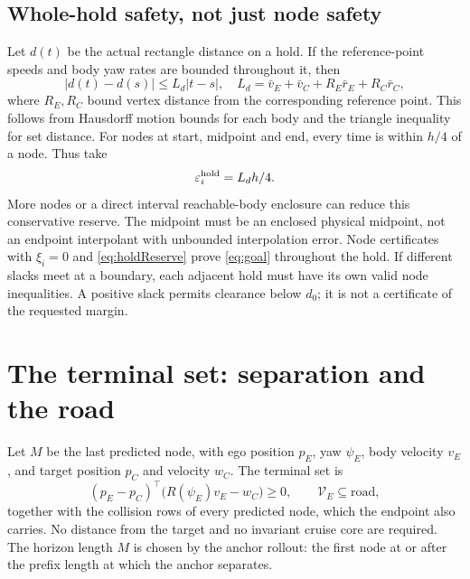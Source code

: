 \documentclass[10pt,letterpaper]{article}
\begin{document}
\subsection{Whole-hold safety, not just node safety}
Let $d(t)$ be the actual rectangle distance on a hold. If the reference-point
speeds and body yaw rates are bounded throughout it, then
\begin{equation}\label{eq:holdLipschitz}
|d(t)-d(s)|\le L_d|t-s|,\quad
L_d=\bar v_E+\bar v_C+R_E\bar r_E+R_C\bar r_C,
\end{equation}
where $R_E,R_C$ bound vertex distance from the corresponding reference point.
This follows from Hausdorff motion bounds for each body and the triangle
inequality for set distance. For nodes at start, midpoint and end, every time
is within $h/4$ of a node. Thus take
\begin{equation}\label{eq:holdReserve}
\varepsilon_i^{\rm hold}=L_dh/4.
\end{equation}
More nodes or a direct interval reachable-body enclosure can reduce this
conservative reserve. The midpoint must be an enclosed physical midpoint, not
an endpoint interpolant with unbounded interpolation error. Node certificates
with $\xi_i=0$ and \eqref{eq:holdReserve} prove \eqref{eq:goal} throughout the
hold. If different slacks meet at a boundary, each adjacent hold must have its
own valid node inequalities. A positive slack permits clearance below $d_0$;
it is not a certificate of the requested margin.

\section{The terminal set: separation and the road}
Let $M$ be the last predicted node, with ego position $p_E$, yaw $\psi_E$,
body velocity $v_E$, and target position $p_C$ and velocity $w_C$. The terminal
set is
\begin{equation}\label{eq:terminal}
(p_E-p_C)^\top\bigl(R(\psi_E)v_E-w_C\bigr)\ge0,\qquad
\mathcal V_E\subseteq\text{road},
\end{equation}
together with the collision rows of every predicted node, which the endpoint
also carries. No distance from the target and no invariant cruise core are
required. The horizon length $M$ is chosen by the anchor rollout: the first node
at or after the prefix length at which the anchor separates.
\end{document}
